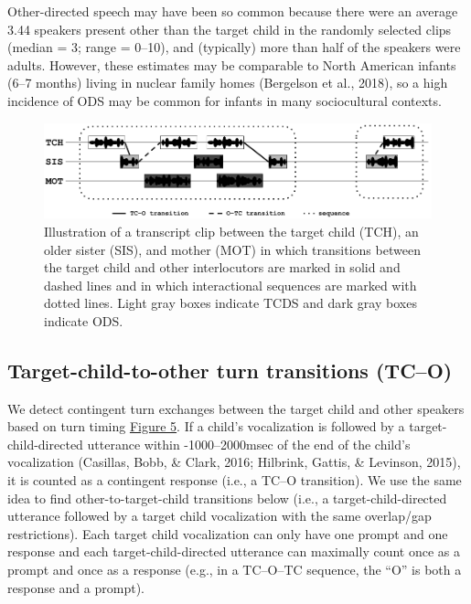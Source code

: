 \documentclass[floatsintext,man]{apa6}
\theoremstyle{definition}
\theoremstyle{definition}
\theoremstyle{definition}
\theoremstyle{remark}
\begin{document}
Other-directed speech may have been so common because there were an
average 3.44 speakers present other than the target child in the
randomly selected clips (median = 3; range = 0--10), and (typically)
more than half of the speakers were adults. However, these estimates may
be comparable to North American infants (6--7 months) living in nuclear
family homes (Bergelson et al., 2018), so a high incidence of ODS may be
common for infants in many sociocultural contexts.

\begin{figure}
\includegraphics[width=1\linewidth]{Tseltal-CLE_files/TseltalCLE-TurnTimingIllustration} \caption{Illustration of a transcript clip between the target child (TCH), an older sister (SIS), and mother (MOT) in which transitions between the target child and other interlocutors are marked in solid and dashed lines and in which interactional sequences are marked with dotted lines. Light gray boxes indicate TCDS and dark gray boxes indicate ODS.}\label{fig:fig5}
\end{figure}

\subsection{Target-child-to-other turn transitions
(TC--O)}\label{target-child-to-other-turn-transitions-tco}

We detect contingent turn exchanges between the target child and other
speakers based on turn timing \protect\hyperlink{fig5}{Figure 5}. If a
child's vocalization is followed by a target-child-directed utterance
within -1000--2000msec of the end of the child's vocalization (Casillas,
Bobb, \& Clark, 2016; Hilbrink, Gattis, \& Levinson, 2015), it is
counted as a contingent response (i.e., a TC--O transition). We use the
same idea to find other-to-target-child transitions below (i.e., a
target-child-directed utterance followed by a target child vocalization
with the same overlap/gap restrictions). Each target child vocalization
can only have one prompt and one response and each target-child-directed
utterance can maximally count once as a prompt and once as a response
(e.g., in a TC--O--TC sequence, the \enquote{O} is both a response and a
prompt).
\end{document}

